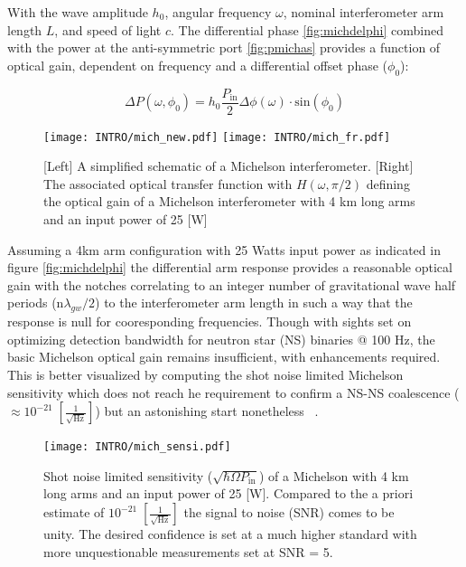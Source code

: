 With the wave amplitude $h_0$, angular frequency $\omega$, nominal interferometer arm length $L$, and speed of light $c$.
The differential phase \autoref{fig:michdelphi} combined with the power at the anti-symmetric port \autoref{fig:pmichas} provides a function of optical gain, dependent on frequency and a differential offset phase ($\phi_0$):

\begin{equation}
	\Delta P(\omega, \phi_0) = h_0 \frac{P_\mathrm{in}}{2} \Delta \phi (\omega) \cdot \mathrm{sin}(\phi_0)
\end{equation}

\begin{figure}[ht!]
	\begin{subcaptiongroup}
		\texttt{[image: INTRO/mich\_new.pdf]}
		\texttt{[image: INTRO/mich\_fr.pdf]}
 	\end{subcaptiongroup}
  	\hfill
	\caption{[Left] A simplified schematic of a Michelson interferometer. [Right] The associated optical transfer function with $H(\omega, \pi/2)$ defining the optical gain of a Michelson interferometer with 4 km long arms and an input power of 25 [W]}
		\label{fig:mich}
\end{figure}
\FloatBarrier

Assuming a 4km arm configuration with 25 Watts input power as indicated in figure \autoref{fig:michdelphi} the differential arm response provides a reasonable optical gain with the notches correlating to an integer number of gravitational wave half periods ($\mathrm{n}\lambda_{gw} / 2$) to the interferometer arm length in such a way that the response is null for cooresponding frequencies. Though with sights set on optimizing detection bandwidth for neutron star (NS) binaries @ 100 Hz, the basic Michelson optical gain remains insufficient, with enhancements required. This is better visualized by computing the shot noise limited Michelson sensitivity which does not reach he requirement to confirm a NS-NS coalescence ($\approx 10^{-21} \; [\frac{1}{\sqrt{\mathrm{Hz}}}]$) but an astonishing start nonetheless ~\cite{saulson:2017}.

\begin{figure}[H]
	\centering
	\texttt{[image: INTRO/mich\_sensi.pdf]}
	\caption{Shot noise limited sensitivity ($\sqrt{\hbar \Omega P_\mathrm{in}}$) of a Michelson with 4 km long arms and an input power of 25 [W]. Compared to the a priori estimate of $10^{-21} \; [\frac{1}{\sqrt{\mathrm{Hz}}}]$ the signal to noise (SNR) comes to be unity. The desired confidence is set at a much higher standard with more unquestionable measurements set at SNR = 5.}
	\label{fig:michsensitivity}
\end{figure}

